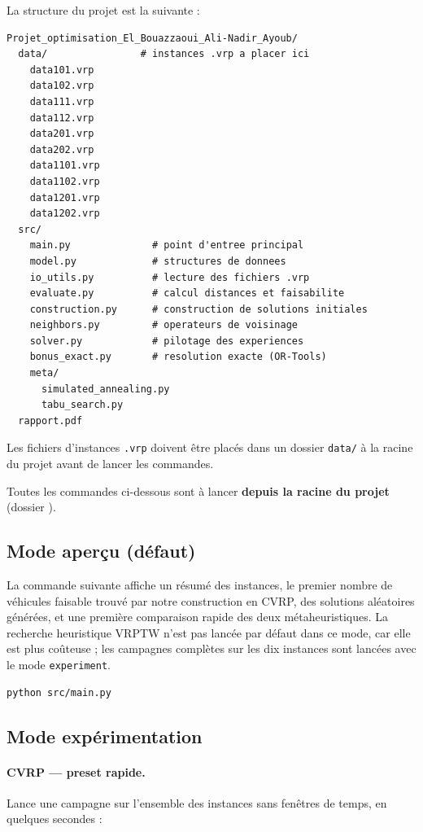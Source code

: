 \documentclass[11pt,a4paper]{article}
\begin{document}
La structure du projet est la suivante :

\begin{lstlisting}
Projet_optimisation_El_Bouazzaoui_Ali-Nadir_Ayoub/
  data/                # instances .vrp a placer ici
    data101.vrp
    data102.vrp
    data111.vrp
    data112.vrp
    data201.vrp
    data202.vrp
    data1101.vrp
    data1102.vrp
    data1201.vrp
    data1202.vrp
  src/
    main.py              # point d'entree principal
    model.py             # structures de donnees
    io_utils.py          # lecture des fichiers .vrp
    evaluate.py          # calcul distances et faisabilite
    construction.py      # construction de solutions initiales
    neighbors.py         # operateurs de voisinage
    solver.py            # pilotage des experiences
    bonus_exact.py       # resolution exacte (OR-Tools)
    meta/
      simulated_annealing.py
      tabu_search.py
  rapport.pdf
\end{lstlisting}

Les fichiers d'instances \texttt{.vrp} doivent être placés dans un dossier \texttt{data/} à la racine du projet avant de lancer les commandes.

Toutes les commandes ci-dessous sont à lancer \textbf{depuis la racine du projet} (dossier ).

\subsection{Mode aperçu (défaut)}

La commande suivante affiche un résumé des instances, le premier nombre de véhicules faisable trouvé par notre construction en CVRP, des solutions aléatoires générées, et une première comparaison rapide des deux métaheuristiques. La recherche heuristique VRPTW n'est pas lancée par défaut dans ce mode, car elle est plus coûteuse ; les campagnes complètes sur les dix instances sont lancées avec le mode \texttt{experiment}.

\begin{lstlisting}
python src/main.py
\end{lstlisting}

\subsection{Mode expérimentation}

\paragraph{CVRP — preset rapide.}
Lance une campagne sur l'ensemble des instances sans fenêtres de temps, en quelques secondes :
\end{document}
